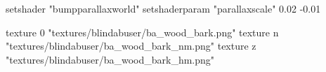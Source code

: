 	setshader "bumpparallaxworld"
	setshaderparam "parallaxscale" 0.02 -0.01

		texture 0 "textures/blindabuser/ba_wood_bark.png"
		texture n "textures/blindabuser/ba_wood_bark_nm.png"
		texture z "textures/blindabuser/ba_wood_bark_hm.png"
